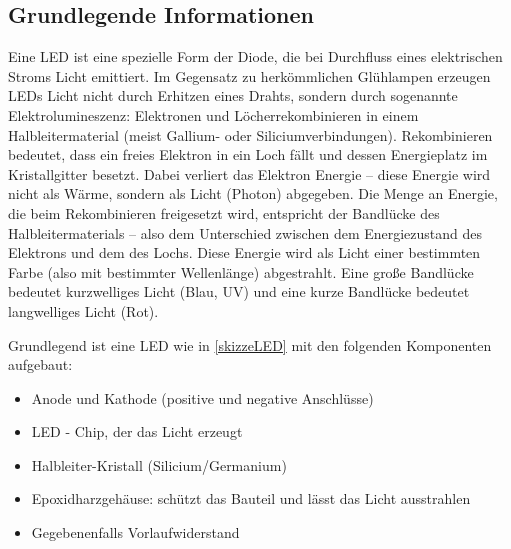 \subsection{Grundlegende Informationen}
Eine LED ist eine spezielle Form der Diode, die bei Durchfluss eines elektrischen Stroms Licht emittiert. Im Gegensatz zu herkömmlichen Glühlampen erzeugen LEDs Licht nicht durch Erhitzen eines Drahts, sondern durch sogenannte Elektrolumineszenz: Elektronen und \glqq Löcher\grqq  rekombinieren in einem Halbleitermaterial (meist Gallium- oder Siliciumverbindungen). Rekombinieren bedeutet, dass ein freies Elektron in ein Loch fällt und dessen Energieplatz im Kristallgitter besetzt. Dabei verliert das Elektron Energie – diese Energie wird nicht als Wärme, sondern als Licht (Photon) abgegeben. Die Menge an Energie, die beim Rekombinieren freigesetzt wird, entspricht der Bandlücke des Halbleitermaterials – also dem Unterschied zwischen dem Energiezustand des Elektrons und dem des Lochs. Diese Energie wird als Licht einer bestimmten Farbe (also mit bestimmter Wellenlänge) abgestrahlt. Eine große Bandlücke bedeutet kurzwelliges Licht (Blau, UV) und eine kurze Bandlücke bedeutet langwelliges Licht (Rot). \cite{Haeberle:2018} \cite{Hering:2024} \cite{Falcon:2025}

Grundlegend ist eine LED wie in \ref{skizzeLED} mit den folgenden Komponenten aufgebaut:
\begin{itemize}
	\item Anode und Kathode (positive und negative Anschlüsse)
	\item LED - Chip, der das Licht erzeugt
	\item Halbleiter-Kristall (Silicium/Germanium)
	\item Epoxidharzgehäuse: schützt das Bauteil und lässt das Licht ausstrahlen
	\item Gegebenenfalls Vorlaufwiderstand 
\end{itemize}

